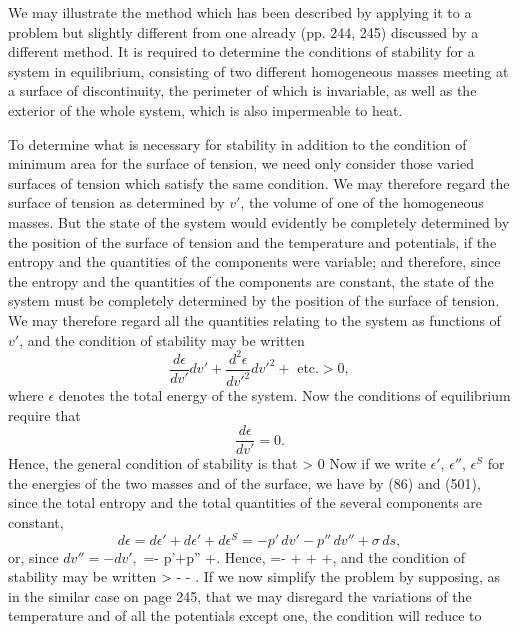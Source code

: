 \documentclass[12pt]{article}
\begin{document}
{We may illustrate the method which has been described by applying it to a problem but slightly different from one already (pp. 244, 245) discussed by a different method. It is required to determine the conditions of stability for a system in equilibrium, consisting of two different homogeneous masses meeting at a surface of discontinuity, the perimeter of which is invariable, as well as the exterior of the whole system, which is also impermeable to heat.

To determine what is necessary for stability in addition to the condition of minimum area for the surface of tension, we need only consider those varied surfaces of tension which satisfy the same condition. We may therefore regard the surface of tension as determined by $v'$, the volume of one of the homogeneous masses. But the state of the system would evidently be completely determined by the position of the surface of tension and the temperature and potentials, if the entropy and the quantities of the components were variable; and therefore, since the entropy and the quantities of the components are constant, the state of the system must be completely determined by the position of the surface of tension. We may therefore regard all the quantities relating to the system as functions of $v'$, and the condition of stability may be written
$$\frac{d\epsilon}{dv'}dv'+ \frac{d^2\epsilon}{dv'^2}dv'^2+ \text{ etc.} > 0, $$
where $\epsilon$ denotes the total energy of the system. Now the conditions of equilibrium require that
$$ \frac{d\epsilon}{dv'}=0.$$
Hence, the general condition of stability is that
\eqs {}> 0\label{541}\eqe
Now if we write $\epsilon'$, $\epsilon''$, $\epsilon^S$ for the energies of the two masses and of the surface, we have by (86) and (501), since the total entropy and the total quantities of the several components are constant,
$$ d\epsilon = d\epsilon' + d\epsilon' + d\epsilon^S = -p' \, dv' -p''\, dv'' + \sigma \, ds, $$
or, since $dv''= -dv',$
\eqs {}=- p'+p'' +\sigma {}. \label{542}\eqe
Hence,
\eqs {}=- + + +\sigma {},  \label{543}\eqe
and the condition of stability may be written
\eqs \sigma {}>  - - .  \label{544}\eqe
If we now simplify the problem by supposing, as in the similar case on page 245, that we may disregard the variations of the temperature and of all the potentials except one, the condition will reduce to    
}
\end{document}
